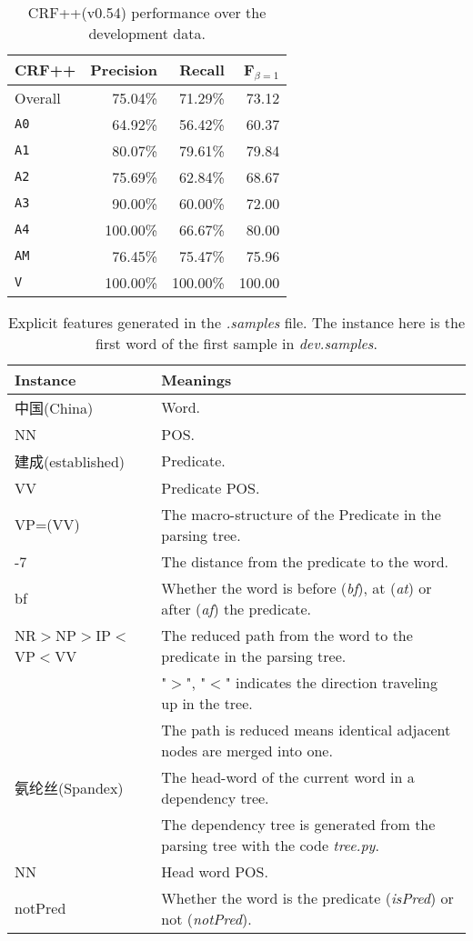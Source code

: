 \documentclass[11pt,a4paper]{article}
\begin{document}
\begin{table}
\label{tab3}
\centering
\begin{tabular}{|l|r|r|r|}\cline{2-4}
\multicolumn{1}{c|}{CRF++}
           & Precision & Recall & F$_{\beta=1}$\\
\hline
Overall            &  75.04\% &  71.29\% &  73.12\\
\hline
\texttt{A0}        &  64.92\% &  56.42\% &  60.37\\
\texttt{A1}        &  80.07\% &  79.61\% &  79.84\\
\texttt{A2}        &  75.69\% &  62.84\% &  68.67\\
\texttt{A3}        &  90.00\% &  60.00\% &  72.00\\
\texttt{A4}        & 100.00\% &  66.67\% &  80.00\\
\texttt{AM}        &  76.45\% &  75.47\% &  75.96\\
\hline
\hline
\texttt{V}         & 100.00\% & 100.00\% & 100.00\\
\hline
\end{tabular}
\caption{CRF++(v0.54) performance over the development data.
  }
\end{table}

\begin{table*}
\label{tab4}
\centering
\begin{tabular}{|l|l|}
\hline
\textbf{Instance} & \textbf{Meanings}\\\hline
中国(China) & Word. \\
NN & POS. \\
建成(established) & Predicate. \\
VV & Predicate POS. \\
VP=(VV) & The macro-structure of the Predicate in the parsing tree. \\
-7 & The distance from the predicate to the word.  \\
bf & Whether the word is before (\textit{bf}), at (\textit{at}) or after (\textit{af}) the predicate. \\
NR$>$NP$>$IP$<$VP$<$VV & The reduced path from the word to the predicate in the parsing tree. \\
  & "$>$", "$<$" indicates the direction traveling up in the tree. \\
  &  The path is reduced means identical adjacent nodes are merged into one. \\
氨纶丝(Spandex) & The head-word of the current word in a dependency tree. \\
  & The dependency tree is generated from the parsing tree with the code \textit{tree.py}. \\
NN & Head word POS. \\
notPred & Whether the word is the predicate (\textit{isPred}) or not (\textit{notPred}). \\\hline
\end{tabular}
\caption{Explicit features generated in the \textit{.samples} file. The instance here is the first word of the first sample in \textit{dev.samples}.}
\end{table*}
\end{document}
